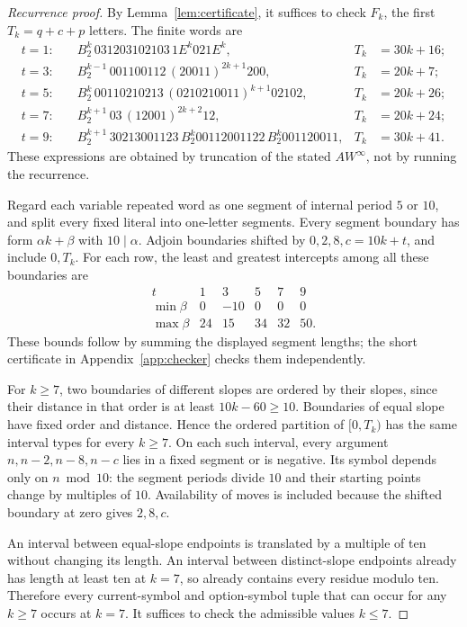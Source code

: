 \documentclass[11pt]{article}
\theoremstyle{remark}\newtheorem{remark}[theorem]{Remark}
\newcommand{\per}{^{\infty}}
\newcommand{\half}[2]{[#1,#2)}
\begin{document}
\begin{proof}[Recurrence proof]
By Lemma~\ref{lem:certificate}, it suffices to check $F_k$, the first $T_k=q+c+p$ letters. The finite words are
\begin{align*}
t=1:\quad &B_2^k\,031203102103\,1E^k021E^k,&T_k&=30k+16;\\
t=3:\quad &B_2^{k-1}\,001100112\,(20011)^{2k+1}200,&T_k&=20k+7;\\
t=5:\quad &B_2^k\,00110210213\,(0210210011)^{k+1}02102,&T_k&=20k+26;\\
t=7:\quad &B_2^{k+1}\,03\,(12001)^{2k+2}12,&T_k&=20k+24;\\
t=9:\quad &B_2^{k+1}\,30213001123\,B_2^k00112001122\,B_2^k001120011,
&T_k&=30k+41.
\end{align*}
These expressions are obtained by truncation of the stated $AW\per$, not by running the recurrence.

Regard each variable repeated word as one segment of internal period $5$ or $10$, and split every fixed literal into one-letter segments. Every segment boundary has form $\alpha k+\beta$ with $10\mid\alpha$. Adjoin boundaries shifted by $0,2,8,c=10k+t$, and include $0,T_k$. For each row, the least and greatest intercepts among all these boundaries are
\[
\begin{array}{c|rrrrr}
t&1&3&5&7&9\\\hline
\min\beta&0&-10&0&0&0\\
\max\beta&24&15&34&32&50.
\end{array}
\]
These bounds follow by summing the displayed segment lengths; the short certificate in Appendix~\ref{app:checker} checks them independently.

For $k\ge7$, two boundaries of different slopes are ordered by their slopes, since their distance in that order is at least $10k-60\ge10$. Boundaries of equal slope have fixed order and distance. Hence the ordered partition of $\half0{T_k}$ has the same interval types for every $k\ge7$. On each such interval, every argument $n,n-2,n-8,n-c$ lies in a fixed segment or is negative. Its symbol depends only on $n\bmod10$: the segment periods divide $10$ and their starting points change by multiples of $10$. Availability of moves is included because the shifted boundary at zero gives $2,8,c$.

An interval between equal-slope endpoints is translated by a multiple of ten without changing its length. An interval between distinct-slope endpoints already has length at least ten at $k=7$, so already contains every residue modulo ten. Therefore every current-symbol and option-symbol tuple that can occur for any $k\ge7$ occurs at $k=7$. It suffices to check the admissible values $k\le7$.


\end{proof}
\end{document}
